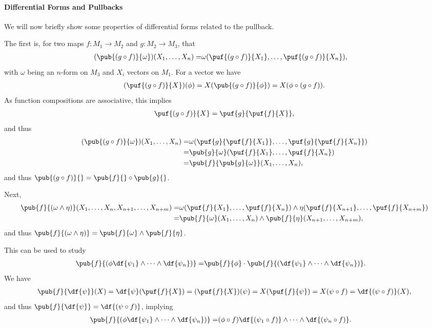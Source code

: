 \paragraph{Differential Forms and Pullbacks}
We will now briefly show some properties of differential forms related to the pullback.

The first is, for two maps $f: M_{1}\to M_{2}$ and $g: M_{2}\to M_{3}$, that
\begin{align*}
	(\pub{(g\circ f)}{\omega})(X_{1}, \dots, X_{n}) =& \omega(\puf{(g\circ f)}{X_{1}}, \dots, \puf{(g\circ f)}{X_{n}}),
\end{align*}
with $\omega$ being an $n$-form on $M_{3}$ and $X_{i}$ vectors on $M_{1}$. For a vector we have
\begin{align*}
	(\puf{(g\circ f)}{X})(\phi) = X(\pub{(g\circ f)}{\phi}) = X(\phi\circ(g\circ f)).
\end{align*}
As function compositions are associative, this implies
\begin{align}
	\puf{(g\circ f)}{X} = \puf{g}{\puf{f}{X}},
\end{align}
and thus
\begin{align*}
	(\pub{(g\circ f)}{\omega})(X_{1}, \dots, X_{n}) =& \omega(\puf{g}{\puf{f}{X_{1}}}, \dots, \puf{g}{\puf{f}{X_{n}}}) \\
	=& \pub{g}{\omega}(\puf{f}{X_{1}}, \dots, \puf{f}{X_{n}}) \\
	=& \pub{f}{\pub{g}{\omega}}(X_{1}, \dots, X_{n}),
\end{align*}
and thus $\pub{(g\circ f)}{} = \pub{f}{}\circ\pub{g}{}$.

Next,
\begin{align*}
	\pub{f}{(\omega\wedge\eta)}(X_{1}, \dots, X_{n}, X_{n + 1}, \dots, X_{n + m}) =& \omega(\puf{f}{X_{1}}, \dots, \puf{f}{X_{n}})\wedge\eta(\puf{f}{X_{n + 1}}, \dots, \puf{f}{X_{n + m}}) \\
	=& \pub{f}{\omega}(X_{1}, \dots, X_{n})\wedge\pub{f}{\eta}(X_{n + 1}, \dots, X_{n + m}),
\end{align*}
and thus $\pub{f}{(\omega\wedge\eta)} = \pub{f}{\omega}\wedge\pub{f}{\eta}$.

This can be used to study
\begin{align*}
	\pub{f}{\left(\phi\df{\psi_{1}}\wedge\dots\wedge\df{\psi_{n}}\right)} =& \pub{f}{\phi}\cdot\pub{f}{(\df{\psi_{1}}\wedge\dots\wedge\df{\psi_{n}})}.
\end{align*}
We have
\begin{align*}
	\pub{f}{\df{\psi}}(X) = \df{\psi}(\puf{f}{X}) = (\puf{f}{X})(\psi) = X(\puf{f}{\psi}) = X(\psi\circ f) = \df{(\psi\circ f)}(X),
\end{align*}
and thus $\pub{f}{\df{\psi}} = \df{(\psi\circ f)}$, implying
\begin{align*}
	\pub{f}{\left(\phi\df{\psi_{1}}\wedge\dots\wedge\df{\psi_{n}}\right)} =& (\phi\circ f)\df{(\psi_{1}\circ f)}\wedge\dots\wedge\df{(\psi_{n}\circ f)}.
\end{align*}

